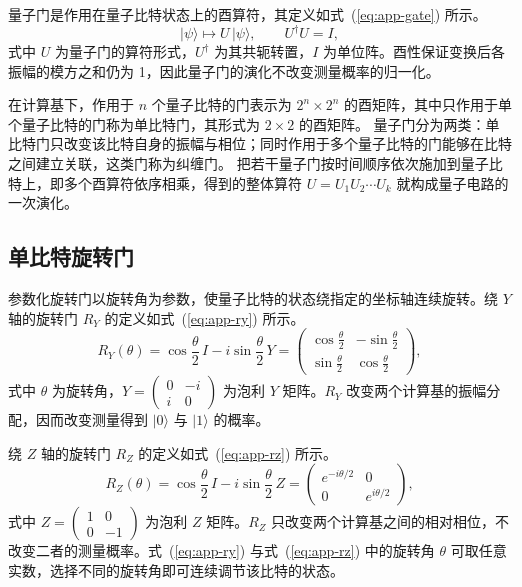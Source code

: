 量子门是作用在量子比特状态上的酉算符，其定义如式~(\ref{eq:app-gate}) 所示。
\begin{equation}
\label{eq:app-gate}
|\psi\rangle \mapsto U\,|\psi\rangle,\qquad U^{\dagger}U = I,
\end{equation}
式中 $U$ 为量子门的算符形式，$U^{\dagger}$ 为其共轭转置，$I$ 为单位阵。酉性保证变换后各振幅的模方之和仍为 1，因此量子门的演化不改变测量概率的归一化。

在计算基下，作用于 $n$ 个量子比特的门表示为 $2^n\times 2^n$ 的酉矩阵，其中只作用于单个量子比特的门称为单比特门，其形式为 $2\times 2$ 的酉矩阵。
量子门分为两类：单比特门只改变该比特自身的振幅与相位；同时作用于多个量子比特的门能够在比特之间建立关联，这类门称为纠缠门。
把若干量子门按时间顺序依次施加到量子比特上，即多个酉算符依序相乘，得到的整体算符 $U = U_1 U_2 \cdots U_k$ 就构成量子电路的一次演化。

\subsection{单比特旋转门}

参数化旋转门以旋转角为参数，使量子比特的状态绕指定的坐标轴连续旋转。绕 $Y$ 轴的旋转门 $R_Y$ 的定义如式~(\ref{eq:app-ry}) 所示。
\begin{equation}
\label{eq:app-ry}
R_Y(\theta) = \cos\frac{\theta}{2}\,I - i\sin\frac{\theta}{2}\,Y = \begin{pmatrix} \cos\frac{\theta}{2} & -\sin\frac{\theta}{2} \\[3pt] \sin\frac{\theta}{2} & \cos\frac{\theta}{2} \end{pmatrix},
\end{equation}
式中 $\theta$ 为旋转角，$Y=\begin{pmatrix}0&-i\\ i&0\end{pmatrix}$ 为泡利 $Y$ 矩阵。$R_Y$ 改变两个计算基的振幅分配，因而改变测量得到 $|0\rangle$ 与 $|1\rangle$ 的概率。

绕 $Z$ 轴的旋转门 $R_Z$ 的定义如式~(\ref{eq:app-rz}) 所示。
\begin{equation}
\label{eq:app-rz}
R_Z(\theta) = \cos\frac{\theta}{2}\,I - i\sin\frac{\theta}{2}\,Z = \begin{pmatrix} e^{-i\theta/2} & 0 \\ 0 & e^{i\theta/2} \end{pmatrix},
\end{equation}
式中 $Z=\begin{pmatrix}1&0\\0&-1\end{pmatrix}$ 为泡利 $Z$ 矩阵。$R_Z$ 只改变两个计算基之间的相对相位，不改变二者的测量概率。式~(\ref{eq:app-ry}) 与式~(\ref{eq:app-rz}) 中的旋转角 $\theta$ 可取任意实数，选择不同的旋转角即可连续调节该比特的状态。


